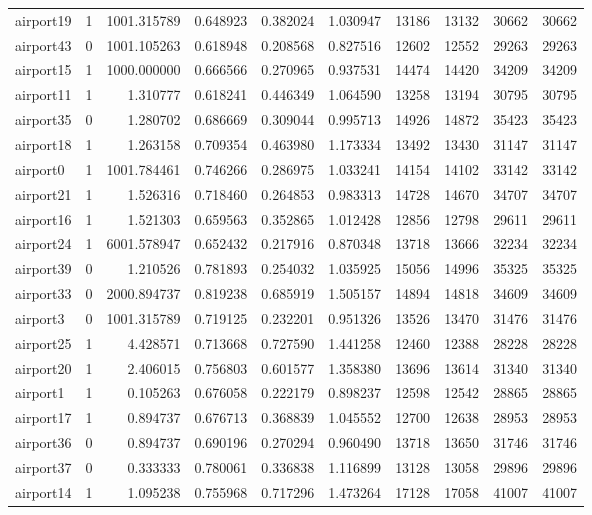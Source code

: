 \begin{longtable}{|l|r|r|r|r|r|r|r|r|r|}
airport19 & 1 & 1001.315789 & 0.648923 & 0.382024 & 1.030947 & 13186 & 13132 & 30662 & 30662 \\
airport43 & 0 & 1001.105263 & 0.618948 & 0.208568 & 0.827516 & 12602 & 12552 & 29263 & 29263 \\
airport15 & 1 & 1000.000000 & 0.666566 & 0.270965 & 0.937531 & 14474 & 14420 & 34209 & 34209 \\
airport11 & 1 & 1.310777 & 0.618241 & 0.446349 & 1.064590 & 13258 & 13194 & 30795 & 30795 \\
airport35 & 0 & 1.280702 & 0.686669 & 0.309044 & 0.995713 & 14926 & 14872 & 35423 & 35423 \\
airport18 & 1 & 1.263158 & 0.709354 & 0.463980 & 1.173334 & 13492 & 13430 & 31147 & 31147 \\
airport0 & 1 & 1001.784461 & 0.746266 & 0.286975 & 1.033241 & 14154 & 14102 & 33142 & 33142 \\
airport21 & 1 & 1.526316 & 0.718460 & 0.264853 & 0.983313 & 14728 & 14670 & 34707 & 34707 \\
airport16 & 1 & 1.521303 & 0.659563 & 0.352865 & 1.012428 & 12856 & 12798 & 29611 & 29611 \\
airport24 & 1 & 6001.578947 & 0.652432 & 0.217916 & 0.870348 & 13718 & 13666 & 32234 & 32234 \\
airport39 & 0 & 1.210526 & 0.781893 & 0.254032 & 1.035925 & 15056 & 14996 & 35325 & 35325 \\
airport33 & 0 & 2000.894737 & 0.819238 & 0.685919 & 1.505157 & 14894 & 14818 & 34609 & 34609 \\
airport3 & 0 & 1001.315789 & 0.719125 & 0.232201 & 0.951326 & 13526 & 13470 & 31476 & 31476 \\
airport25 & 1 & 4.428571 & 0.713668 & 0.727590 & 1.441258 & 12460 & 12388 & 28228 & 28228 \\
airport20 & 1 & 2.406015 & 0.756803 & 0.601577 & 1.358380 & 13696 & 13614 & 31340 & 31340 \\
airport1 & 1 & 0.105263 & 0.676058 & 0.222179 & 0.898237 & 12598 & 12542 & 28865 & 28865 \\
airport17 & 1 & 0.894737 & 0.676713 & 0.368839 & 1.045552 & 12700 & 12638 & 28953 & 28953 \\
airport36 & 0 & 0.894737 & 0.690196 & 0.270294 & 0.960490 & 13718 & 13650 & 31746 & 31746 \\
airport37 & 0 & 0.333333 & 0.780061 & 0.336838 & 1.116899 & 13128 & 13058 & 29896 & 29896 \\
airport14 & 1 & 1.095238 & 0.755968 & 0.717296 & 1.473264 & 17128 & 17058 & 41007 & 41007 \\

\end{longtable}
